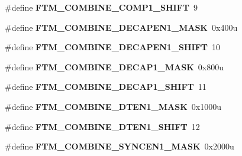 \begin{DoxyCompactItemize}
\item 
\#define {\bfseries F\+T\+M\+\_\+\+C\+O\+M\+B\+I\+N\+E\+\_\+\+C\+O\+M\+P1\+\_\+\+S\+H\+I\+FT}~9\hypertarget{group__FTM__Register__Masks_ga58bf0f457a2ce6f35ad0f75115bbcc90}{}\label{group__FTM__Register__Masks_ga58bf0f457a2ce6f35ad0f75115bbcc90}

\item 
\#define {\bfseries F\+T\+M\+\_\+\+C\+O\+M\+B\+I\+N\+E\+\_\+\+D\+E\+C\+A\+P\+E\+N1\+\_\+\+M\+A\+SK}~0x400u\hypertarget{group__FTM__Register__Masks_ga75b422313fe76b13eb70022f15120d3f}{}\label{group__FTM__Register__Masks_ga75b422313fe76b13eb70022f15120d3f}

\item 
\#define {\bfseries F\+T\+M\+\_\+\+C\+O\+M\+B\+I\+N\+E\+\_\+\+D\+E\+C\+A\+P\+E\+N1\+\_\+\+S\+H\+I\+FT}~10\hypertarget{group__FTM__Register__Masks_ga6fa24cab05a8839e131ce86612a77330}{}\label{group__FTM__Register__Masks_ga6fa24cab05a8839e131ce86612a77330}

\item 
\#define {\bfseries F\+T\+M\+\_\+\+C\+O\+M\+B\+I\+N\+E\+\_\+\+D\+E\+C\+A\+P1\+\_\+\+M\+A\+SK}~0x800u\hypertarget{group__FTM__Register__Masks_ga8fdebd40c2860511d58ce7e15cf7a875}{}\label{group__FTM__Register__Masks_ga8fdebd40c2860511d58ce7e15cf7a875}

\item 
\#define {\bfseries F\+T\+M\+\_\+\+C\+O\+M\+B\+I\+N\+E\+\_\+\+D\+E\+C\+A\+P1\+\_\+\+S\+H\+I\+FT}~11\hypertarget{group__FTM__Register__Masks_ga888ebd3f18cacc007fa0cd2073cdca1d}{}\label{group__FTM__Register__Masks_ga888ebd3f18cacc007fa0cd2073cdca1d}

\item 
\#define {\bfseries F\+T\+M\+\_\+\+C\+O\+M\+B\+I\+N\+E\+\_\+\+D\+T\+E\+N1\+\_\+\+M\+A\+SK}~0x1000u\hypertarget{group__FTM__Register__Masks_ga9d461bde34f5c5fad944a58e61c3fb44}{}\label{group__FTM__Register__Masks_ga9d461bde34f5c5fad944a58e61c3fb44}

\item 
\#define {\bfseries F\+T\+M\+\_\+\+C\+O\+M\+B\+I\+N\+E\+\_\+\+D\+T\+E\+N1\+\_\+\+S\+H\+I\+FT}~12\hypertarget{group__FTM__Register__Masks_ga6a1bc35db122f0f887a50b1ac9157657}{}\label{group__FTM__Register__Masks_ga6a1bc35db122f0f887a50b1ac9157657}

\item 
\#define {\bfseries F\+T\+M\+\_\+\+C\+O\+M\+B\+I\+N\+E\+\_\+\+S\+Y\+N\+C\+E\+N1\+\_\+\+M\+A\+SK}~0x2000u\hypertarget{group__FTM__Register__Masks_gad635d904007b2c80c096efe6f5a8c7c2}{}\label{group__FTM__Register__Masks_gad635d904007b2c80c096efe6f5a8c7c2}


\end{DoxyCompactItemize}
